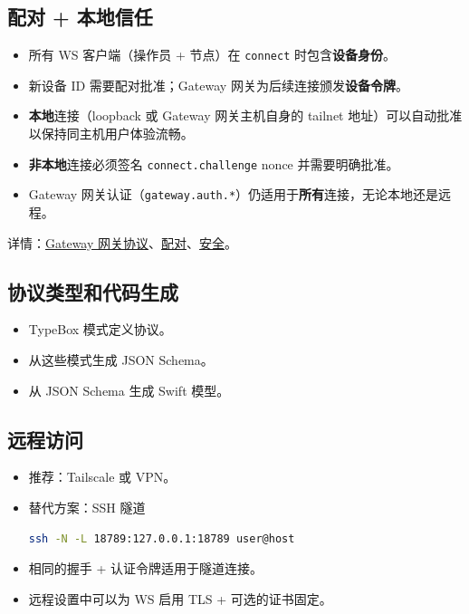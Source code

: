 \subsection{配对 + 本地信任}


\begin{itemize}
  \item 所有 WS 客户端（操作员 + 节点）在 \texttt{connect} 时包含\textbf{设备身份}。
  \item 新设备 ID 需要配对批准；Gateway 网关为后续连接颁发\textbf{设备令牌}。
  \item \textbf{本地}连接（loopback 或 Gateway 网关主机自身的 tailnet 地址）可以自动批准以保持同主机用户体验流畅。
  \item \textbf{非本地}连接必须签名 \texttt{connect.challenge} nonce 并需要明确批准。
  \item Gateway 网关认证（\texttt{gateway.auth.*}）仍适用于\textbf{所有}连接，无论本地还是远程。
\end{itemize}


详情：\href{/gateway/protocol}{Gateway 网关协议}、\href{/channels/pairing}{配对}、\href{/gateway/security}{安全}。

\subsection{协议类型和代码生成}


\begin{itemize}
  \item TypeBox 模式定义协议。
  \item 从这些模式生成 JSON Schema。
  \item 从 JSON Schema 生成 Swift 模型。
\end{itemize}


\subsection{远程访问}


\begin{itemize}
  \item 推荐：Tailscale 或 VPN。
  \item 替代方案：SSH 隧道
\begin{lstlisting}[language=bash]
  ssh -N -L 18789:127.0.0.1:18789 user@host
\end{lstlisting}

  \item 相同的握手 + 认证令牌适用于隧道连接。
  \item 远程设置中可以为 WS 启用 TLS + 可选的证书固定。
\end{itemize}


